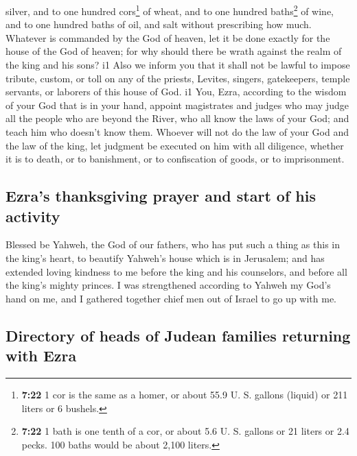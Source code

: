 silver, and to one hundred cors\footnote{\textbf{7:22} 1 cor is the same
  as a homer, or about 55.9 U. S. gallons (liquid) or 211 liters or 6
  bushels.} of wheat, and to one hundred baths\footnote{\textbf{7:22} 1
  bath is one tenth of a cor, or about 5.6 U. S. gallons or 21 liters or
  2.4 pecks. 100 baths would be about 2,100 liters.} of wine, and to one
hundred baths of oil, and salt without prescribing how much.
 Whatever is commanded by the God of heaven, let it be
done exactly for the house of the God of heaven; for why should there be
wrath against the realm of the king and his sons? i1 
Also we inform you that it shall not be lawful to impose tribute,
custom, or toll on any of the priests, Levites, singers, gatekeepers,
temple servants, or laborers of this house of God. i1 
You, Ezra, according to the wisdom of your God that is in your hand,
appoint magistrates and judges who may judge all the people who are
beyond the River, who all know the laws of your God; and teach him who
doesn't know them.  Whoever will not do the law of your
God and the law of the king, let judgment be executed on him with all
diligence, whether it is to death, or to banishment, or to confiscation
of goods, or to imprisonment.

\hypertarget{ezras-thanksgiving-prayer-and-start-of-his-activity}{%
\subsection{Ezra's thanksgiving prayer and start of his
activity}\label{ezras-thanksgiving-prayer-and-start-of-his-activity}}

 Blessed be Yahweh, the God of our fathers, who has put
such a thing as this in the king's heart, to beautify Yahweh's house
which is in Jerusalem;  and has extended loving kindness
to me before the king and his counselors, and before all the king's
mighty princes. I was strengthened according to Yahweh my God's hand on
me, and I gathered together chief men out of Israel to go up with me.

\hypertarget{directory-of-heads-of-judean-families-returning-with-ezra}{%
\subsection{Directory of heads of Judean families returning with
Ezra}\label{directory-of-heads-of-judean-families-returning-with-ezra}}

